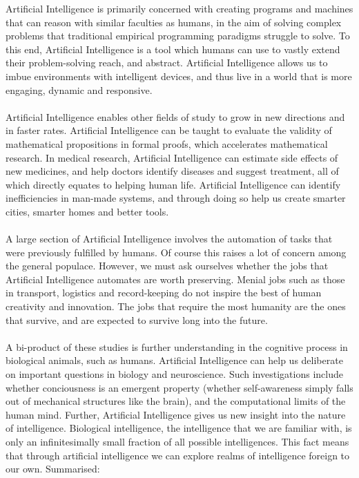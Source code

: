 \documentclass[10pt,a4paper]{article}
\begin{document}
				Artificial Intelligence is primarily concerned with creating programs and machines that can reason with similar faculties as humans, in the aim of solving complex problems that traditional empirical programming paradigms struggle to solve. To this end, Artificial Intelligence is a tool which humans can use to vastly extend their problem-solving reach, and abstract. Artificial Intelligence allows us to imbue environments with intelligent devices, and thus live in a world that is more engaging, dynamic and responsive.
				\\\\
				Artificial Intelligence enables other fields of study to grow in new directions and in faster rates. Artificial Intelligence can be taught to evaluate the validity of mathematical propositions in formal proofs, which accelerates mathematical research. In medical research, Artificial Intelligence can estimate side effects of new medicines, and help doctors identify diseases and suggest treatment, all of which directly equates to helping human life. Artificial Intelligence can identify inefficiencies in man-made systems, and through doing so help us create smarter cities, smarter homes and better tools.
				\\\\
				A large section of Artificial Intelligence involves the automation of tasks that were previously fulfilled by humans. Of course this raises a lot of concern among the general populace. However, we must ask ourselves whether the jobs that Artificial Intelligence automates are worth preserving. Menial jobs such as those in transport, logistics and record-keeping do not inspire the best of human creativity and innovation. The jobs that require the most humanity are the ones that survive, and are expected to survive long into the future.
				\\\\
				A bi-product of these studies is further understanding in the cognitive process in biological animals, such as humans. Artificial Intelligence can help us deliberate on important questions in biology and neuroscience. Such investigations include whether conciousness is an emergent property (whether self-awareness simply falls out of mechanical structures like the brain), and the computational limits of the human mind. Further, Artificial Intelligence gives us new insight into the nature of intelligence. Biological intelligence, the intelligence that we are familiar with, is only an infinitesimally small fraction of all possible intelligences. This fact means that through artificial intelligence we can explore realms of intelligence foreign to our own. Summarised:
		
\end{document}
